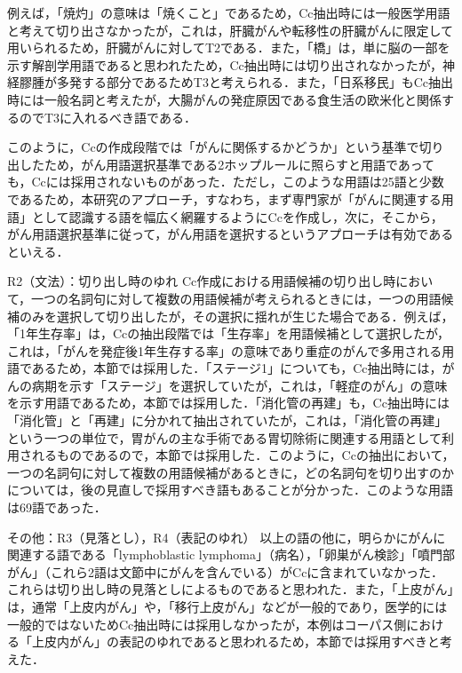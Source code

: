 \documentclass[japanese]{jnlp_1.4}
\renewcommand{\paragraph}{}
\begin{document}
例えば，「焼灼」の意味は「焼くこと」であるため，Cc抽出時には一般医学用語と考えて切り出さなかったが，これは，肝臓がんや転移性の肝臓がんに限定して用いられるため，肝臓がんに対してT2である．また，「橋」は，単に脳の一部を示す解剖学用語であると思われたため，Cc抽出時には切り出されなかったが，神経膠腫が多発する部分であるためT3と考えられる．また，「日系移民」もCc抽出時には一般名詞と考えたが，大腸がんの発症原因である食生活の欧米化と関係するのでT3に入れるべき語である．

このように，Ccの作成段階では「がんに関係するかどうか」という基準で切り出したため，がん用語選択基準である2ホップルールに照らすと用語であっても，Ccには採用されないものがあった．ただし，このような用語は25語と少数であるため，本研究のアプローチ，すなわち，まず専門家が「がんに関連する用語」として認識する語を幅広く網羅するようにCcを作成し，次に，そこから，がん用語選択基準に従って，がん用語を選択するというアプローチは有効であるといえる．

\paragraph{R2（文法）：切り出し時のゆれ}
\label{s:R2（文法）：切り出し時のゆれ}
Cc作成における用語候補の切り出し時において，一つの名詞句に対して複数の用語候補が考えられるときには，一つの用語候補のみを選択して切り出したが，その選択に揺れが生じた場合である．例えば，「1年生存率」は，Ccの抽出段階では「生存率」を用語候補として選択したが，これは，「がんを発症後1年生存する率」の意味であり重症のがんで多用される用語であるため，本節では採用した．「ステージ1」についても，Cc抽出時には，がんの病期を示す「ステージ」を選択していたが，これは，「軽症のがん」の意味を示す用語であるため，本節では採用した．「消化管の再建」も，Cc抽出時には「消化管」と「再建」に分かれて抽出されていたが，これは，「消化管の再建」という一つの単位で，胃がんの主な手術である胃切除術に関連する用語として利用されるものであるので，本節では採用した．このように，Ccの抽出において，一つの名詞句に対して複数の用語候補があるときに，どの名詞句を切り出すのかについては，後の見直しで採用すべき語もあることが分かった．このような用語は69語であった．

\paragraph{その他：R3（見落とし），R4（表記のゆれ）}
\label{s:その他：R3（見落とし），R4（表記のゆれ）}
以上の語の他に，明らかにがんに関連する語である「lymphoblastic lymphoma」（病名），「卵巣がん検診」「噴門部がん」（これら2語は文節中にがんを含んでいる）がCcに含まれていなかった．これらは切り出し時の見落としによるものであると思われた．また，「上皮がん」は，通常「上皮内がん」や，「移行上皮がん」などが一般的であり，医学的には一般的ではないためCc抽出時には採用しなかったが，本例はコーパス側における「上皮内がん」の表記のゆれであると思われるため，本節では採用すべきと考えた．
\end{document}
